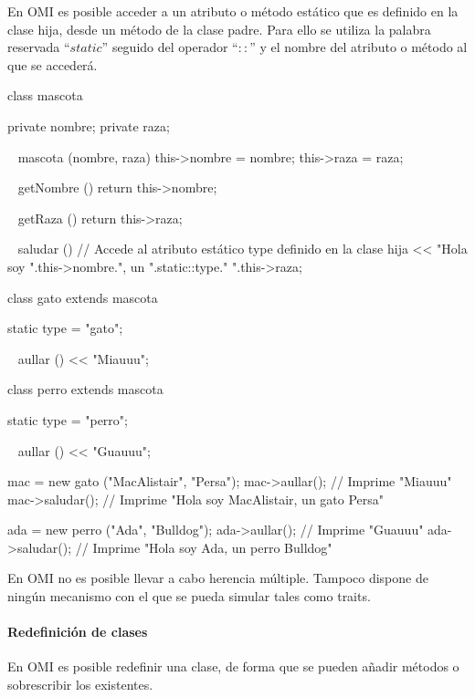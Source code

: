 En OMI es posible acceder a un atributo o método estático que es definido en la clase hija, desde un método de
la clase padre. Para ello se utiliza la palabra reservada ``$static$'' seguido del operador ``$::$'' y el 
nombre del atributo o método al que se accederá. \\

\begin{myverbatim}
   class mascota {
      private nombre; 
      private raza;
      
      ~ mascota (nombre, raza) { 
        this->nombre = nombre; 
        this->raza = raza;
      }
      
      ~ getNombre () {
         return this->nombre;
      }
      
      ~ getRaza () {
         return this->raza;
      }
      
      ~ saludar () {
         // Accede al atributo estático type definido en la clase hija
         << "Hola soy ".this->nombre.", un ".static::type." ".this->raza;  
      }
      
   }

   class gato extends mascota {
       static type = "gato";
       
       ~ aullar () { 
         << "Miauuu";
      }
   }

   class perro extends mascota {
      static type = "perro";
       
       ~ aullar () { 
         << "Guauuu";
      }
   }
   
   mac = new gato ("MacAlistair", "Persa"); 
   mac->aullar(); // Imprime "Miauuu"
   mac->saludar(); // Imprime "Hola soy MacAlistair, un gato Persa"
   
   ada = new perro ("Ada", "Bulldog"); 
   ada->aullar(); // Imprime "Guauuu"
   ada->saludar(); // Imprime "Hola soy Ada, un perro Bulldog"

\end{myverbatim}



En OMI no es posible llevar a cabo herencia múltiple. Tampoco dispone de ningún
mecanismo con el que se pueda simular tales como traits. 

\paragraph{Redefinición de clases}
En OMI es posible redefinir una clase, de forma que se pueden añadir métodos o sobrescribir los 
existentes. 

